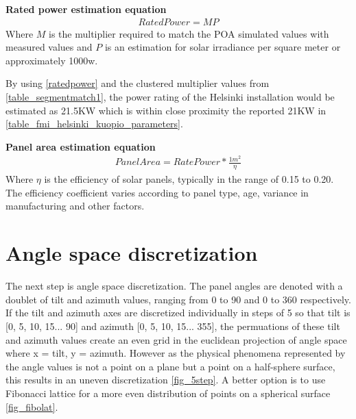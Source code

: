\noindent \textbf{Rated power estimation equation}
\begin{align}
	RatedPower =  MP \label{ratedpower}
\end{align}
Where $M$ is the multiplier required to match the POA simulated values with measured values and $P$ is an estimation for solar irradiance per square meter or approximately 1000w. 

\vspace{5mm}
\noindent By using \ref{ratedpower} and the clustered multiplier values from \ref{table_segmentmatch1}, the power rating of the Helsinki installation would be estimated as 21.5KW which is within close proximity the reported 21KW in \ref{table_fmi_helsinki_kuopio_parameters}.





\noindent \textbf{Panel area estimation equation}
\begin{align}
	PanelArea =  RatePower * \frac{1m^2}{\eta}
\end{align}
Where $\eta$ is the efficiency of solar panels, typically in the range of 0.15 to 0.20. The efficiency coefficient varies according to panel type, age, variance in manufacturing and other factors.
\vspace{5mm}

\newpage
\section{Angle space discretization}\label{angle_space_discretization}
The next step is angle space discretization. The panel angles are denoted with a doublet of tilt and azimuth values, ranging from 0 to 90 and 0 to 360 respectively. If the tilt and azimuth axes are discretized individually in steps of 5 so that tilt is [0, 5, 10, 15... 90] and azimuth [0, 5, 10, 15... 355], the permuations of these tilt and azimuth values create an even grid in the euclidean projection of angle space where x = tilt, y = azimuth. However as the physical phenomena represented by the angle values is not a point on a plane but a point on a half-sphere surface, this results in an uneven discretization \ref{fig_5step}. A better option is to use Fibonacci lattice \cite{fibolat2} for a more even distribution of points on a spherical surface \ref{fig_fibolat}.

